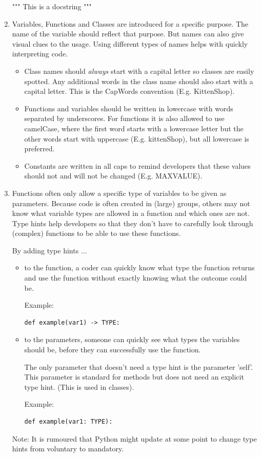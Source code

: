 \documentclass{tufte-handout}
\newcommand{\B}{\bfseries}
\begin{document}
\begin{enumerate}
  """ This is a docstring """

\item Variables, Functions and Classes are introduced for a specific purpose.
\marginpar{\B Naming}
  The name of the variable should reflect that purpose.
  But names can also give visual clues to the usage. 
  Using different types of names helps with quickly interpreting code.
  \begin{itemize}
      \item Class names should \emph{always} start with a capital letter so classes are easily spotted. Any additional words in the class name should also start with a capital letter. This is the CapWords convention (E.g. KittenShop).
      \item Functions and variables should be written in lowercase with words separated by underscores. 
      For functions it is also allowed to use camelCase, where the first word starts with a lowercase letter but the other words start with uppercase (E.g. kittenShop), but all lowercase is preferred.
      \item Constants are written in all caps to remind developers that these values should not and will not be changed (E.g. MAXVALUE).
  \end{itemize}
  
  

\item Functions often only allow a specific type of variables 
\marginpar{\B Type~Hints}
  to be given as parameters.
  Because code is often created in (large) groups, others may not know what variable types are allowed in a function and which ones are not.
  Type hints help developers so that they don't have to carefully look through (complex) functions to be able to use these functions.
  
  By adding type hints ...
  \begin{itemize}
      \item to the function, a coder can quickly know what type the function returns and use the function without exactly knowing what the outcome could be.
      
      Example: \begin{lstlisting}[numbers=none]
      def example(var1) -> TYPE:
      \end{lstlisting}
      \item to the parameters, someone can quickly see what types the variables should be, before they can successfully use the function.
      
      The only parameter that doesn't need a type hint is the parameter 'self'. This parameter is standard for methods but does not need an explicit type hint. (This is used in classes).
      
      Example: \begin{lstlisting}[numbers=none]
      def example(var1: TYPE):
      \end{lstlisting}
  \end{itemize}
  Note: It is rumoured that Python might update at some point to change type hints from voluntary to mandatory.


\end{enumerate}
\end{document}
